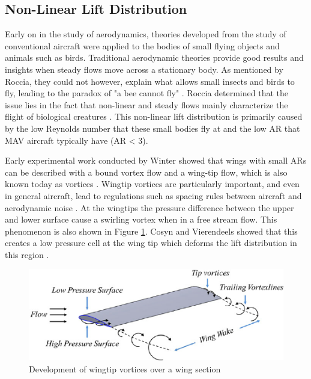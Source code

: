
\subsection{Non-Linear Lift Distribution}


\label{sec:Non-Linear Lift Distribution}
Early on in the study of aerodynamics, theories developed from the study of conventional aircraft were applied to the bodies of small flying objects and animals such as birds. Traditional aerodynamic theories provide good results and insights when steady flows move across a stationary body. As mentioned by Roccia, they could not however, explain what allows small insects and birds to fly, leading to the paradox of "a bee cannot fly" \cite{bees} \cite{Roccia2016}. Roccia determined that the issue lies in the fact that non-linear and steady flows mainly characterize the flight of biological creatures \cite{Roccia2016}. This non-linear lift distribution is primarily caused by the low Reynolds number that these small bodies fly at and the low \acrshort{AR} that \acrshort{MAV} aircraft typically have (\acrshort{AR} < 3).

 Early experimental work conducted by Winter showed that wings with small \acrshort{AR}s can be described with a bound vortex flow and a wing-tip flow, which is also known today as vortices \cite{H1936}. Wingtip vortices are particularly important, and even in general aircraft, lead to regulations such as spacing rules between aircraft and aerodynamic noise \cite{Qin2021}. At the wingtips the pressure difference between the upper and lower surface cause a swirling vortex when in a free stream flow. This phenomenon is also shown in Figure \ref{fig:vortex}. Cosyn and Vierendeels showed that this creates a low pressure cell at the wing tip which deforms the lift distribution in this region \cite{Cosyn2006}. 
 
 \begin{figure}[H]
  \centering
  \includegraphics[width=\linewidth]{03_LiteratureReview/Figs/Development-of-wingtip-vortices-over-a-wing-section.png}
  \caption{ Development of wingtip vortices over a wing section 
 \cite{Kumar2015}}
  \label{fig:vortex}
\end{figure}


